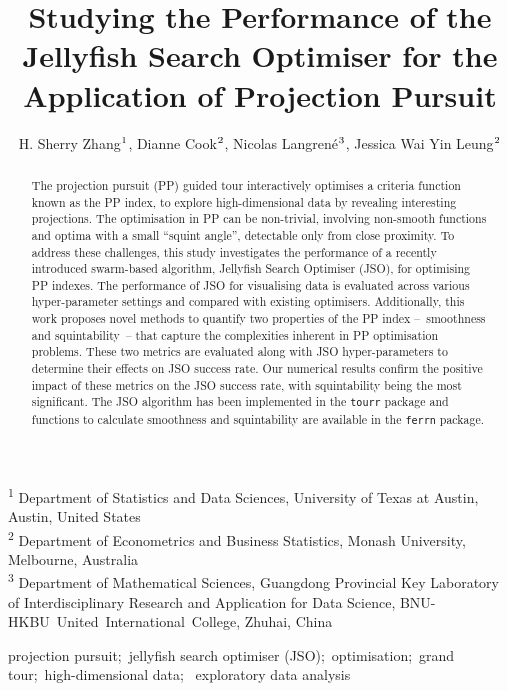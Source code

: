 \documentclass[
  12pt,
]{interact}
\title{Studying the Performance of the Jellyfish Search Optimiser for
the Application of Projection Pursuit}
\author{H. Sherry Zhang$\textsuperscript{1}$, Dianne
Cook$\textsuperscript{2}$, Nicolas
Langrené$\textsuperscript{3}$, Jessica Wai Yin
Leung$\textsuperscript{2}$}
\theoremstyle{plain}
\begin{document}
\captionsetup{labelsep=space}
\maketitle
\textsuperscript{1} Department of Statistics and Data
Sciences, University of Texas at Austin, Austin, United
States\\ \textsuperscript{2} Department of Econometrics and Business
Statistics, Monash
University, Melbourne, Australia\\ \textsuperscript{3} Department of
Mathematical Sciences, Guangdong Provincial Key Laboratory of
Interdisciplinary Research and Application for Data Science,
BNU-HKBU~United~International~College, Zhuhai, China
\begin{abstract}
The projection pursuit (PP) guided tour interactively optimises a
criteria function known as the PP index, to explore high-dimensional
data by revealing interesting projections. The optimisation in PP can be
non-trivial, involving non-smooth functions and optima with a small
``squint angle'', detectable only from close proximity. To address these
challenges, this study investigates the performance of a recently
introduced swarm-based algorithm, Jellyfish Search Optimiser (JSO), for
optimising PP indexes. The performance of JSO for visualising data is
evaluated across various hyper-parameter settings and compared with
existing optimisers. Additionally, this work proposes novel methods to
quantify two properties of the PP index --~smoothness and
squintability~-- that capture the complexities inherent in PP
optimisation problems. These two metrics are evaluated along with JSO
hyper-parameters to determine their effects on JSO success rate. Our
numerical results confirm the positive impact of these metrics on the
JSO success rate, with squintability being the most significant. The JSO
algorithm has been implemented in the \texttt{tourr} package and
functions to calculate smoothness and squintability are available in the
\texttt{ferrn} package.
\end{abstract}
\begin{keywords}
\def\sep{;\ }
projection pursuit\sep jellyfish search optimiser
(JSO)\sep optimisation\sep grand tour\sep high-dimensional data\sep 
exploratory data analysis
\end{keywords}
\ifdefined\Shaded\renewenvironment{Shaded}{\begin{tcolorbox}[enhanced, frame hidden, sharp corners, interior hidden, breakable, borderline west={3pt}{0pt}{shadecolor}, boxrule=0pt]}{\end{tcolorbox}}\fi
\end{document}
